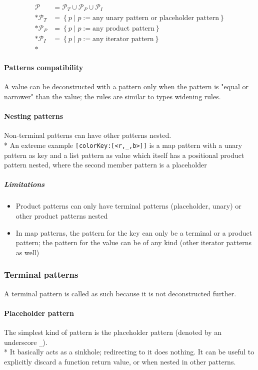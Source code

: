 \documentclass[11pt]{report}
\newcommand{\set}[1]{\left\{#1\right\}}
\newcommand{\code}[1]{\texttt{\colorbox{gray!10}{#1}}}
\newcommand{\pattern}{p}
\newcommand{\Pattern}{\mathcal{P}}
\newcommand{\PatternTerminal}{\Pattern_T}
\newcommand{\PatternProduct}{\Pattern_P}
\newcommand{\PatternIterator}{\Pattern_I}
\theoremstyle{definition}
\begin{document}
\[
	\begin{split}
		\Pattern         &= \PatternTerminal \cup \PatternProduct \cup \PatternIterator\\*
		\PatternTerminal &= \set{\pattern \mid \pattern := \text{any unary pattern or placeholder pattern}}\\*
		\PatternProduct  &= \set{\pattern \mid \pattern := \text{any product pattern}}\\*
		\PatternIterator &= \set{\pattern \mid \pattern := \text{any iterator pattern}}\\*
	\end{split}
\]

\paragraph{Patterns compatibility} A value can be deconstructed with a
pattern only when the pattern is "equal or narrower" than the value; the rules
are similar to types widening rules.

\paragraph{Nesting patterns} Non-terminal patterns can have other patterns
nested.\\*
An extreme example \code{[colorKey:[<r,\_,b>]]} is a map pattern with a unary
pattern as key and a list pattern as value which itself has a positional
product pattern nested, where the second member pattern is a placeholder

\subparagraph{Limitations}
\begin{itemize}
	\item Product patterns can only have terminal patterns (placeholder, unary)
		or other product patterns nested
	\item In map patterns, the pattern for the key can only be a terminal or a
		product pattern; the pattern for the value can be of any kind (other
		iterator patterns as well)
\end{itemize}

\subsubsection{Terminal patterns}

A terminal pattern is called as such because it is not deconstructed further.

\paragraph{Placeholder pattern} The simplest kind of pattern is the placeholder
pattern (denoted by an underscore \code{\_}).\\*
It basically acts as a sinkhole; redirecting to it does nothing. It can be
useful to explicitly discard a function return value, or when nested in other
patterns.
\end{document}
